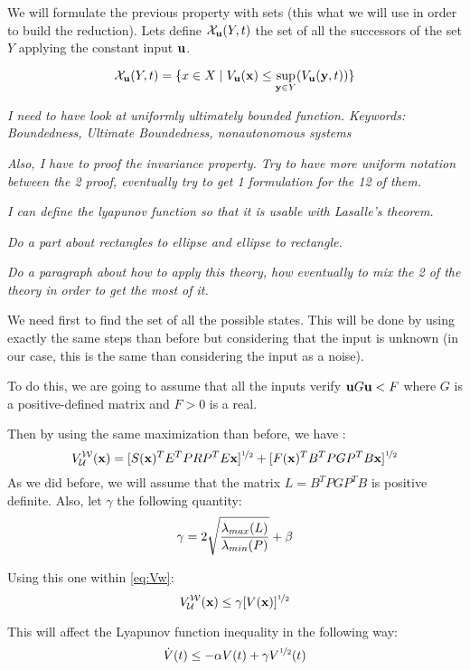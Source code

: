 We will formulate the previous property with sets (this what we will use in order to build the reduction).
Lets define $\mathcal{X}_{ \mathbf{u}}(Y,t)$ the set of all the successors of the set $Y$ applying the constant input $ \mathbf{u}$.

$$\mathcal{X}_{ \mathbf{u}}(Y,t) = \{x \in X \mid V_{ \mathbf{u}}( \mathbf{x}) \leq \sup_{ \mathbf{y} \in Y}(V_{ \mathbf{u}}( \mathbf{y},t)) \}$$

\textit{I need to have look at uniformly ultimately bounded function. Keywords: Boundedness, Ultimate Boundedness, nonautonomous systems}

\textit{Also, I have to proof the invariance property. Try to have more uniform notation between the 2 proof, eventually try to get 1 formulation for the 12 of them.}

\textit{I can define the lyapunov function so that it is usable with Lasalle's theorem.}

\textit{Do a part about rectangles to ellipse and ellipse to rectangle.}

\textit{Do a paragraph about how to apply this theory, how eventually to mix the 2 of the theory in order to get the most of it.}

We need first to find the set of all the possible states.
This will be done by using exactly the same steps than before but considering that the input is unknown (in our case, this is the same than considering the input as a noise).

To do this, we are going to assume that all the inputs verify $ \mathbf{u} G  \mathbf{u} < F$ where $G$ is a positive-defined matrix and $F>0$ is a real.

Then by using the same maximization than before, we have :
\newcommand{\Vw}{V_{\mathcal{U}}^{\mathcal{W}}}
\newcommand{\Vsup}{\overline{V}}
\begin{equation}\label{eq:Vw}
\Vw(\vect{x}) =
[S (\vect{x})^T E^T P R P^T E \vect{x} ]^{\nicefrac{1}{2}}+
[F (\vect{x})^T B^T P G P^T B \vect{x} ]^{\nicefrac{1}{2}}
\end{equation}
As we did before, we will assume that the matrix $L = B^T P G P^T B$ is positive definite.
Also, let $\gamma$ the following quantity:
$$\gamma = 2 \sqrt{\frac{\lambda_{max}(L)}{\lambda_{min}(P)}} + \beta$$

Using this one within \ref{eq:Vw}:
$$\Vw(\vect{x}) \leq \gamma [V(\vect{x})]^{\nicefrac{1}{2}}$$

This will affect the Lyapunov function inequality in the following way:
$$\dot{V}(t) \leq -\alpha V(t) + \gamma V^{\nicefrac{1}{2}}(t)$$

